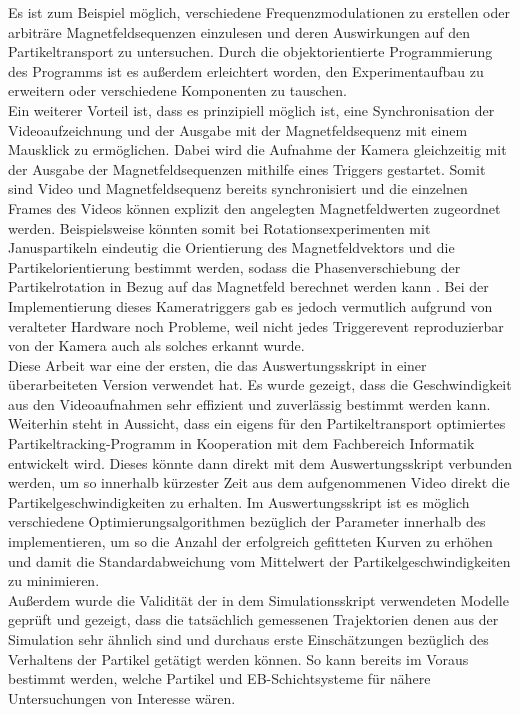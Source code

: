 \documentclass[page,pdftex,12pt,a4paper,twoside,openright]{scrbook}
\begin{document}
Es ist zum Beispiel möglich, verschiedene Frequenzmodulationen zu erstellen oder arbiträre Magnetfeldsequenzen einzulesen und deren Auswirkungen auf den Partikeltransport zu untersuchen. Durch die objektorientierte Programmierung des Programms ist es außerdem erleichtert worden, den Experimentaufbau zu erweitern oder verschiedene Komponenten zu tauschen.\\
Ein weiterer Vorteil ist, dass es prinzipiell möglich ist, eine Synchronisation der Videoaufzeichnung und der Ausgabe mit der Magnetfeldsequenz mit einem Mausklick zu ermöglichen. Dabei wird die Aufnahme der Kamera gleichzeitig mit der Ausgabe der Magnetfeldsequenzen mithilfe eines Triggers gestartet. Somit sind Video und Magnetfeldsequenz bereits synchronisiert und die einzelnen Frames des Videos können explizit den angelegten Magnetfeldwerten zugeordnet werden. Beispielsweise könnten somit bei Rotationsexperimenten mit Januspartikeln eindeutig die Orientierung des Magnetfeldvektors und die Partikelorientierung bestimmt werden, sodass die Phasenverschiebung der Partikelrotation in Bezug auf das Magnetfeld berechnet werden kann \cite{reginka_physical_2018}. Bei der Implementierung dieses Kameratriggers gab es jedoch vermutlich aufgrund von veralteter Hardware noch Probleme, weil nicht jedes Triggerevent reproduzierbar von der Kamera auch als solches erkannt wurde.\\

Diese Arbeit war eine der ersten, die das Auswertungsskript \cite{holzinger_pythonscript_nodate} in einer überarbeiteten Version verwendet hat. Es wurde gezeigt, dass die Geschwindigkeit aus den Videoaufnahmen sehr effizient und zuverlässig bestimmt werden kann. Weiterhin steht in Aussicht, dass ein eigens für den Partikeltransport optimiertes Partikeltracking-Programm in Kooperation mit dem Fachbereich Informatik entwickelt wird. Dieses könnte dann direkt mit dem Auswertungsskript verbunden werden, um so innerhalb kürzester Zeit aus dem aufgenommenen Video direkt die Partikelgeschwindigkeiten zu erhalten. Im Auswertungsskript ist es möglich verschiedene Optimierungsalgorithmen bezüglich der Parameter innerhalb des implementieren, um so die Anzahl der erfolgreich gefitteten Kurven zu erhöhen und damit die Standardabweichung vom Mittelwert der Partikelgeschwindigkeiten zu minimieren.\\
Außerdem wurde die Validität der in dem Simulationsskript \cite{holzinger_pythonscript_nodate-1} verwendeten Modelle geprüft und gezeigt, dass die tatsächlich gemessenen Trajektorien denen aus der Simulation sehr ähnlich sind und durchaus erste Einschätzungen bezüglich des Verhaltens der Partikel getätigt werden können. So kann bereits im Voraus bestimmt werden, welche Partikel und EB-Schichtsysteme für nähere Untersuchungen von Interesse wären.\\
\end{document}
